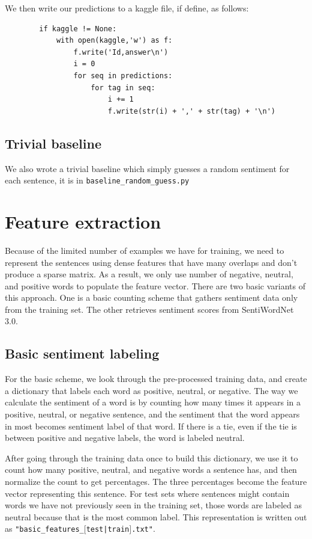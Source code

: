 \documentclass{article}
\begin{document}
We then write our predictions to a kaggle file, if define, as follows:
\begin{verbatim}
        if kaggle != None:
            with open(kaggle,'w') as f:
                f.write('Id,answer\n')
                i = 0
                for seq in predictions:
                    for tag in seq:
                        i += 1
                        f.write(str(i) + ',' + str(tag) + '\n')
\end{verbatim}

\subsection{Trivial baseline}
We also wrote a trivial baseline which simply guesses a random sentiment for each sentence, it is in \texttt{baseline\_random\_guess.py}


\section{Feature extraction}
Because of the limited number of examples we have for training, we need to represent the sentences using dense features that have many overlaps and don't produce a sparse matrix. As a result, we only use number of negative, neutral, and positive words to populate the feature vector. There are two basic variants of this approach. One is a basic counting scheme that gathers sentiment data only from the training set. The other retrieves sentiment scores from SentiWordNet 3.0.

\subsection{Basic sentiment labeling}
For the basic scheme, we look through the pre-processed training data, and create a dictionary that labels each word as positive, neutral, or negative. The way we calculate the sentiment of a word is by counting how many times it appears in a positive, neutral, or negative sentence, and the sentiment that the word appears in most becomes sentiment label of that word. If there is a tie, even if the tie is between positive and negative labels, the word is labeled neutral.

After going through the training data once to build this dictionary, we use it to count how many positive, neutral, and negative words a sentence has, and then normalize the count to get percentages. The three percentages become the feature vector representing this sentence. For test sets where sentences might contain words we have not previously seen in the training set, those words are labeled as neutral because that is the most common label. This representation is written out as \texttt{"basic\_features\_$[$test|train$]$.txt"}. 
\end{document}
